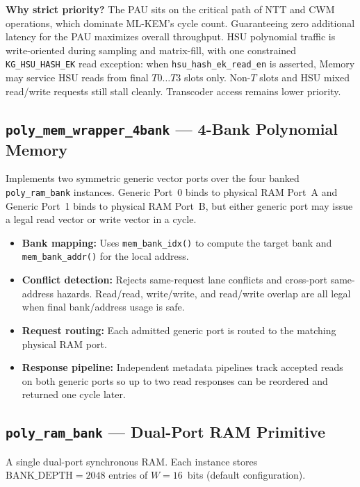 \documentclass[11pt,letterpaper]{article}
\begin{document}
\textbf{Why strict priority?} The PAU sits on the critical path of NTT
and CWM operations, which dominate ML-KEM's cycle count. Guaranteeing
zero additional latency for the PAU maximizes overall throughput. HSU
polynomial traffic is write-oriented during sampling and matrix-fill, with
one constrained \texttt{KG\_HSU\_HASH\_EK} read exception: when
\texttt{hsu\_hash\_ek\_read\_en} is asserted, Memory may service HSU reads
from final $T0\ldots T3$ slots only. Non-$T$ slots and HSU mixed read/write
requests still stall cleanly. Transcoder access remains lower priority.

\subsection{\texttt{poly\_mem\_wrapper\_4bank} --- 4-Bank Polynomial
Memory}

Implements two symmetric generic vector ports over the four banked
\texttt{poly\_ram\_bank} instances. Generic Port~0 binds to physical
RAM Port~A and Generic Port~1 binds to physical RAM Port~B, but either
generic port may issue a legal read vector or write vector in a cycle.

\begin{itemize}
  \item \textbf{Bank mapping:} Uses \texttt{mem\_bank\_idx()} to compute
    the target bank and \texttt{mem\_bank\_addr()} for the local address.
  \item \textbf{Conflict detection:} Rejects same-request lane conflicts
    and cross-port same-address hazards. Read/read, write/write, and
    read/write overlap are all legal when final bank/address usage is safe.
  \item \textbf{Request routing:} Each admitted generic port is routed to
    the matching physical RAM port.
  \item \textbf{Response pipeline:} Independent metadata pipelines track
    accepted reads on both generic ports so up to two read responses can be
    reordered and returned one cycle later.
\end{itemize}

\subsection{\texttt{poly\_ram\_bank} --- Dual-Port RAM Primitive}

A single dual-port synchronous RAM. Each instance stores
$\text{BANK\_DEPTH} = 2048$ entries of $W = 16$~bits (default
configuration).
\end{document}
